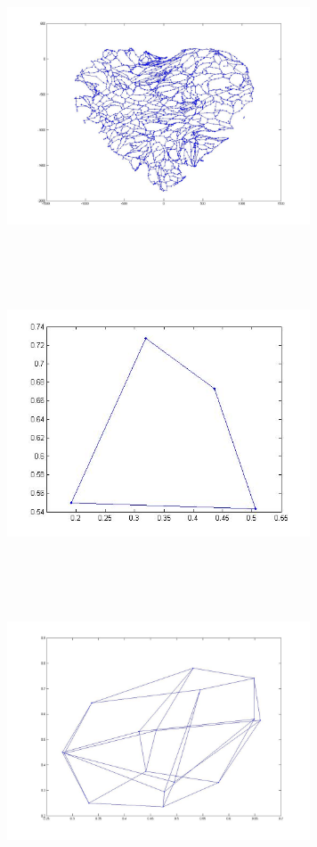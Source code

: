 \includegraphics[width=9.0cm,height=9.0cm]{images/GraphTheory/gursoy_atun_layou_topology_heart.jpg}
\includegraphics[width=9.0cm,height=9.0cm]{images/GraphTheory/hypercube_3_Dimension.jpg}
\includegraphics[width=9.0cm,height=9.0cm]{images/GraphTheory/hypercube_4_Dimension.jpg}
